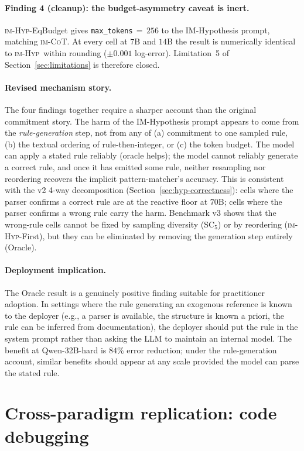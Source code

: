 \documentclass[11pt]{article}
\newcommand{\imhyp}{\textsc{im-Hyp}}
\newcommand{\imcot}{\textsc{im-CoT}}
\begin{document}
\paragraph{Finding 4 (cleanup):  the budget-asymmetry caveat is
inert.}  \imhyp{}-EqBudget gives \texttt{max\_tokens}\,$=$\,$256$
to the IM-Hypothesis prompt, matching \imcot.  At every cell at
$7$B and $14$B the result is numerically identical to \imhyp\
within rounding ($\pm 0.001$ log-error).  Limitation~5 of
Section~\ref{sec:limitations} is therefore closed.

\paragraph{Revised mechanism story.}
The four findings together require a sharper account than the
original commitment story.  The harm of the IM-Hypothesis prompt
appears to come from the \emph{rule-generation} step, not from any
of (a) commitment to one sampled rule, (b) the textual ordering
of rule-then-integer, or (c) the token budget.  The model can
apply a stated rule reliably (oracle helps); the model cannot
reliably generate a correct rule, and once it has emitted some
rule, neither resampling nor reordering recovers the implicit
pattern-matcher's accuracy.  This is consistent with the v2 4-way
decomposition (Section~\ref{sec:hyp-correctness}):  cells where
the parser confirms a correct rule are at the reactive floor at
$70$B; cells where the parser confirms a wrong rule carry the
harm.  Benchmark v3 shows that the wrong-rule cells cannot be
fixed by sampling diversity (SC$_5$) or by reordering
(\imhyp{}-First), but they can be eliminated by removing the
generation step entirely (Oracle).

\paragraph{Deployment implication.}
The Oracle result is a genuinely positive finding suitable for
practitioner adoption.  In settings where the rule generating an
exogenous reference is known to the deployer (e.g., a parser is
available, the structure is known a priori, the rule can be
inferred from documentation), the deployer should put the rule
in the system prompt rather than asking the LLM to maintain an
internal model.  The benefit at Qwen-32B-hard is $84\%$ error
reduction; under the rule-generation account, similar benefits
should appear at any scale provided the model can parse the
stated rule.


\section{Cross-paradigm replication: code debugging}
\label{sec:code-debug}
\end{document}
